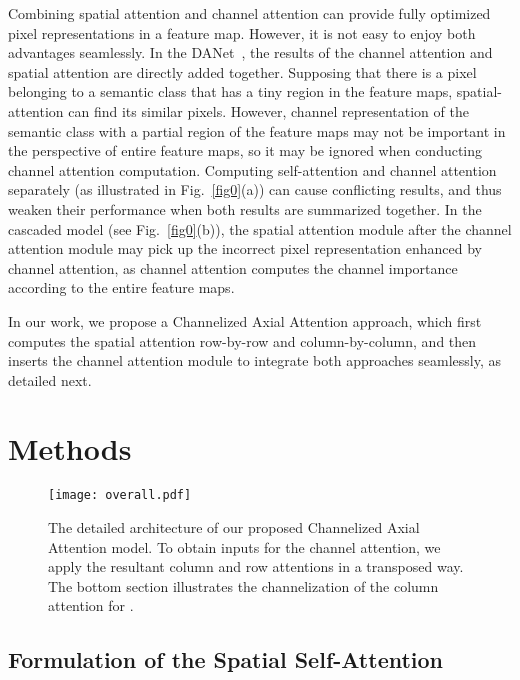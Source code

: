 \documentclass[journal]{IEEEtran}
\begin{document}
Combining spatial attention and channel attention can provide fully optimized pixel representations in a feature map. 
However, it is not easy to enjoy both advantages seamlessly. 
In the DANet~\cite{cDualAttention}, the results of the channel attention and spatial attention are directly added together.
Supposing that there is a pixel belonging to a semantic class that has a tiny region in the feature maps, spatial-attention can find its similar pixels. 
However, channel representation of the semantic class with a partial region of the feature maps may not be important in the perspective of entire feature maps, so it may be ignored when conducting channel attention computation. 
Computing self-attention and channel attention separately (as illustrated in Fig.~\ref{fig0}(a)) can cause conflicting results, and thus weaken their performance when both results are summarized together.  
In the cascaded model (see Fig.~\ref{fig0}(b)), the spatial attention module after the channel attention module may pick up the incorrect pixel representation enhanced by channel attention, as channel attention computes the channel importance according to the entire feature maps. 

In our work, we propose a Channelized Axial Attention approach, which first computes the spatial attention row-by-row and column-by-column, and then inserts the channel attention module to integrate both approaches seamlessly, as detailed next.  




\section{Methods}
\label {sectMethods}

\begin{figure*}[h]
	\centering
	\texttt{[image: overall.pdf]}
	\caption{The detailed architecture of our proposed Channelized Axial Attention model. To obtain  inputs for the channel attention, we apply the resultant column and row attentions in a transposed way. 
		The bottom section illustrates the channelization of the column attention for .}
	\label{fdetail}
	\label{figOverall}
\end{figure*}


\subsection {Formulation of the Spatial Self-Attention}
\label {sAxialAttention}
\end{document}
